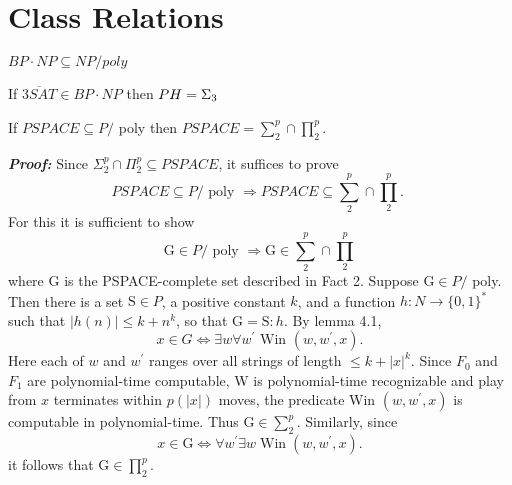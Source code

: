 \section{Class Relations}
\begin{prop}{}{}
$BP\cdot NP\subseteq NP/poly$
\end{prop}

\begin{prop}{}{}
    If $\overline{3SAT}\in BP\cdot NP$ then $PH=\Sigma_3$
\end{prop}

\begin{prop}{}{}
If $P S P A C E \subseteq P /$ poly then $P S P A C E=\sum_2^p \cap \prod_2^p$. 
\end{prop}

\textbf{\textit{Proof: }}Since $\Sigma_2^p \cap \Pi_2^p \subseteq P S P A C E$, it suffices to prove
$$
P S P A C E \subseteq P / \text { poly } \Rightarrow P S P A C E \subseteq \sum_2^p \cap \prod_2^p \text {. }
$$
For this it is sufficient to show
$$
\mathrm{G} \in P / \text { poly } \Rightarrow \mathrm{G} \in \sum_2^p \cap \prod_2^p
$$
where $\mathrm{G}$ is the PSPACE-complete set described in Fact 2. Suppose $\mathrm{G} \in P /$ poly. Then there is a set $\mathrm{S} \in P$, a positive constant $k$, and a function $h: N \rightarrow\{0,1\}^*$ such that $|h(n)| \leqslant k+n^k$, so that $\mathrm{G}=\mathrm{S}: h$. By lemma 4.1,
$$
x \in G \Leftrightarrow \exists w \forall w^{\prime} \text { Win }\left(w, w^{\prime}, x\right) .
$$
Here each of $w$ and $w^{\prime}$ ranges over all strings of length $\leqslant k+|x|^k$. Since $F_0$ and $F_1$ are polynomial-time computable, W is polynomial-time recognizable and play from $x$ terminates within $p(|x|)$ moves, the predicate Win $\left(w, w^{\prime}, x\right)$ is computable in polynomial-time. Thus $\mathrm{G} \in \sum_2^p$. Similarly, since
$$
x \in \mathrm{G} \Leftrightarrow \forall w^{\prime} \exists w \operatorname{Win}\left(w, w^{\prime}, x\right) .
$$
it follows that $\mathrm{G} \in \prod_2^p$.